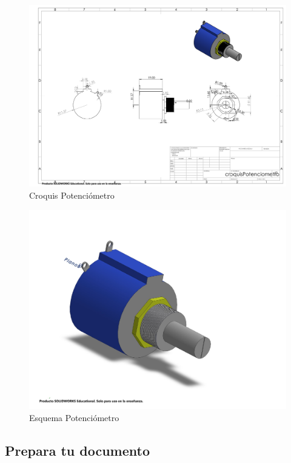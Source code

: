     \begin{figure}[H]
        \centering
        \includegraphics[trim = {1mm 1mm 1mm 1mm},clip,scale=0.2]{25/img/croquisPotenciometro.PDF}
        \caption{Croquis Potenciómetro}
        \label{Croquis:Potenciometro}
    \end{figure}
    \begin{figure}[H]
        \centering
        \includegraphics[trim = {10mm 10mm 10mm 10mm},clip,scale=0.2]{25/img/potenciometro.pdf}
        \caption{Esquema Potenciómetro}
        \label{fig:Potenciometro}
    \end{figure}
    \subsection{Prepara tu documento}
    
